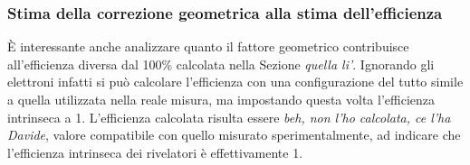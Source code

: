 \subsubsection{Stima della correzione geometrica alla stima dell'efficienza}
\`E interessante anche analizzare quanto il fattore geometrico contribuisce all'efficienza diversa dal 100\% calcolata nella Sezione \textit{quella li'}. Ignorando gli elettroni infatti si pu\`o calcolare l'efficienza con una configurazione del tutto simile a quella utilizzata nella reale misura, ma impostando questa volta l'efficienza intrinseca a 1. L'efficienza calcolata risulta essere \textit{beh, non l'ho calcolata, ce l'ha Davide}, valore compatibile con quello misurato sperimentalmente, ad indicare che l'efficienza intrinseca dei rivelatori \`e effettivamente 1.
